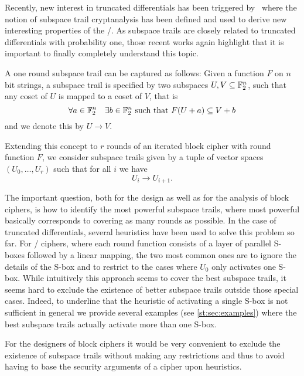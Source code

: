 Recently, new interest in truncated differentials has been triggered by~\cite{ToSC:GraRecRon16} where the notion of subspace trail cryptanalysis has been defined and used to derive new interesting properties of the \AES/.
As subspace trails are closely related to truncated differentials with probability one, those recent works again highlight that it is important to finally completely understand this topic.

A one round subspace trail can be captured as follows: Given a function $F$ on $n$ bit strings, a subspace trail is specified by two subspaces $U,V \subseteq \mathbb{F}_2^n$, such that any coset of $U$ is mapped to a coset of $V$, that is
\begin{equation*}
    \forall a\in \mathbb{F}_2^n \quad \exists b \in \mathbb{F}_2^n \ \text{such that}\ F(U+a) \subseteq V+b
\end{equation*}
and we denote this by $U \rightarrow V$.

Extending this concept to $r$ rounds of an iterated block cipher with round function $F$, we consider subspace trails given by a tuple of vector spaces $(U_0, \ldots, U_r)$ such that for all $i$ we have
\begin{equation*}
    U_i \rightarrow U_{i+1}.
\end{equation*}

The important question, both for the design as well as for the analysis of block ciphers, is how to identify the most powerful subspace trails, where most powerful basically corresponds to covering as many rounds as possible.
In the case of truncated differentials, several heuristics have been used to solve this problem so far.
For \SPN/ ciphers, where each round function consists of a layer of parallel S-boxes followed by a linear mapping, the two most common ones are to ignore the details of the S-box and to restrict to the cases where $U_0$ only activates one S-box.
While intuitively this approach seems to cover the best subspace trails, it seems hard to exclude the existence of better subspace trails outside those special cases.
Indeed, to underline that the heuristic of activating a single S-box is not sufficient in general we provide several examples (see \cref{st:sec:examples}) where the best subspace trails actually activate more than one S-box.

For the designers of block ciphers it would be very convenient to exclude the existence of subspace trails without making any restrictions and thus to avoid having to base the security arguments of a cipher upon heuristics.

